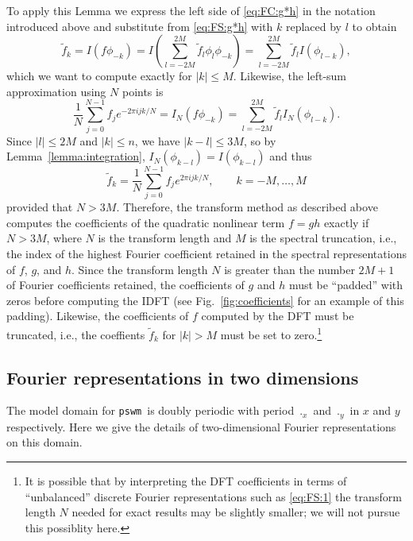\documentclass[12pt]{article}
\newcommand{\abs}[1]{\left|{#1}\right|}
\newcommand{\fc}[1]{\widetilde{#1}} %
\newcommand{\code}[1]{\texttt{#1}}
\newcommand{\pswm}{\code{pswm}}
\begin{document}
To apply this Lemma we express the left side of \eqref{eq:FC:g*h} in the 
notation introduced above and substitute from \eqref{eq:FS:g*h} with $k$ 
replaced by $l$ to obtain
\begin{equation}
   \fc{f}_k = I\left(f\phi_{-k}\right) 
            = I\left(\sum_{l=-2M}^{2M} \fc{f}_l \phi_l \phi_{-k}\right)
            = \sum_{l=-2M}^{2M} \fc{f}_l I\left(\phi_{l-k}\right),
\label{eq:FC:g*h:I}
\end{equation}
which we want to compute exactly for $\abs{k}\le M$.  Likewise, the left-sum
approximation using $N$ points is
\begin{equation}
   \frac{1}{N}\sum_{j=0}^{N-1} f_j e^{-2\pi ijk/N} = I_N\left(f\phi_{-k}\right) 
      = \sum_{l=-2M}^{2M} \fc{f}_l I_N\left(\phi_{l-k}\right).
\label{eq:FC:g*h:I_N}
\end{equation}
Since $\abs{l}\le 2M$ and $\abs{k}\le n$, we have $\abs{k-l}\le 3M$, so by 
Lemma~\ref{lemma:integration}, $I_N(\phi_{k-l})=I(\phi_{k-l})$ and thus
\begin{equation}
   \fc{f}_k = \frac{1}{N}\sum_{j=0}^{N-1} f_j e^{2\pi ijk/N},
\qquad k=-M,\dots,M
\end{equation}
provided that $N>3M$.  Therefore, the transform method as described above
computes the coefficients of the quadratic nonlinear term $f=gh$ exactly if
$N>3M$, where $N$ is the transform length and $M$ is the spectral truncation,
i.e., the index of the highest Fourier coefficient retained in the
spectral representations of $f$, $g$, and $h$.  Since the transform length $N$
is greater than the number $2M+1$ of Fourier coefficients retained, the
coefficients of $g$ and $h$ must be ``padded'' with zeros before computing the
IDFT (see Fig.~\ref{fig:coefficients} for an example of this padding).
Likewise, the coefficients of $f$ computed by the DFT must be truncated, i.e.,
the coeffients $\fc{f}_k$ for $\abs{k}>M$ must be set to zero.\footnote{It is
possible that by interpreting the DFT coefficients in terms of ``unbalanced''
discrete Fourier representations such as \eqref{eq:FS:1} the transform length
$N$ needed for exact results may be slightly smaller; we will not pursue this
possiblity here.}

\pagebreak[4]
\subsection{Fourier representations in two dimensions}

The model domain for \pswm\ is doubly periodic with period $\period_x$ and
$\period_y$ in $x$ and $y$ respectively.  Here we give the details of
two-dimensional Fourier representations on this domain.
\end{document}
